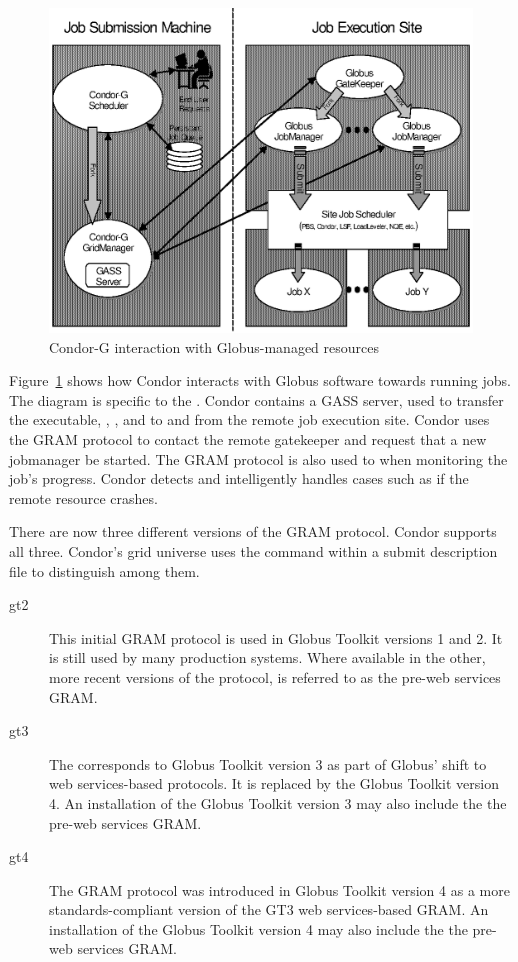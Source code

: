 \begin{figure}[hbt]
\centering
\includegraphics{grids/gfig1.eps}
\caption{\label{fig:condorg}Condor-G interaction with Globus-managed resources}
\end{figure}

Figure~\ref{fig:condorg} shows how Condor interacts with Globus software
towards running jobs.
The diagram is specific to the  .
Condor contains a GASS server, used to transfer the executable,
, , and  to and from
the remote job execution site.
Condor uses the GRAM protocol to contact the remote gatekeeper
and request that a new jobmanager be started.
The GRAM protocol is also used to when monitoring the job's progress.
Condor detects and intelligently handles cases
such as if the remote resource crashes.

There are now three different versions of the GRAM protocol.
Condor supports all three.
Condor's grid universe uses the  command within
a submit description file to distinguish among them.
\begin{description}
\item[gt2]
This initial GRAM protocol is used in Globus Toolkit versions 1 and 2.
It is still used by many production systems.
Where available in the other, more recent versions of the protocol,
 is referred to as the pre-web services GRAM.
\item[gt3]
The   corresponds to
Globus Toolkit version 3 as part of
Globus' shift to web services-based protocols.
It is replaced by  the Globus Toolkit version 4.
An installation of the Globus Toolkit version 3 may also
include the the pre-web services GRAM.
\item[gt4]
The GRAM protocol was introduced in Globus Toolkit version 4 as a more
standards-compliant version of the GT3 web services-based GRAM.
An installation of the Globus Toolkit version 4 may also
include the the pre-web services GRAM.
\end{description}

